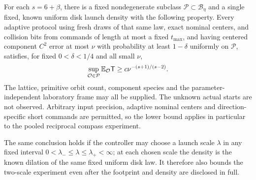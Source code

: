 \begin{theorem}
\label{thm:stationary-lower}
For each $s=6+\beta$, there is a fixed nondegenerate subclass
$\mathcal P\subset\mathcal B_\eta$ and a single fixed, known uniform
disk launch density with the following property. Every adaptive protocol
using fresh draws of that same law, exact nominal centers, and collision
bits from commands of length at most a fixed $t_{\max}$, and having
centered component $C^2$ error at most $\nu$ with probability at least
$1-\delta$ uniformly on $\mathcal P$, satisfies, for fixed
$0<\delta<1/4$ and all small $\nu$,
\begin{equation}\label{eq:stationary-lower}
       \sup_{\mathcal O\in\mathcal P}\mathbb E_{\mathcal O}\mathsf T
                            \ge c\nu^{-(s+1)/(s-2)}.
\end{equation}
The lattice, primitive orbit count, component species and the
parameter-independent laboratory frame may all be supplied. The unknown
actual starts are not observed. Arbitrary input precision, adaptive
nominal centers and direction-specific short commands are permitted,
so the lower bound applies in particular to the pooled reciprocal
compass experiment.

The same conclusion holds if the controller may choose a launch scale
$\lambda$ in any fixed interval $0<\lambda_-\le\lambda\le\lambda_+<\infty$;
at each chosen scale the density is the known dilation of the same fixed
uniform disk law. It therefore also bounds the two-scale experiment even
after the footprint and density are disclosed in full.
\end{theorem}
